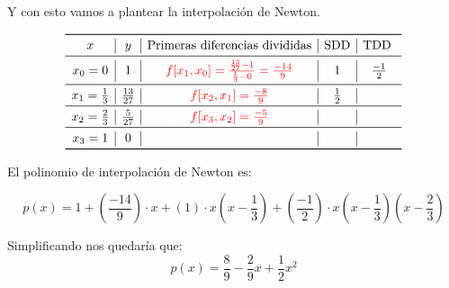 Y con esto vamos a plantear la interpolación de Newton.

\[
\begin{array}{c | c | c | c | c}
\toprule
x & y & \text{Primeras diferencias divididas} & \text{SDD} & \text{TDD } \\
\midrule
x_0 = 0 & 1 & \textcolor{red}{f[x_1, x_0] = \frac{\frac{13}{27} - 1}{\frac{1}{3} - 0} = \frac{-14}{9}} & 1 & \frac{-1}{2}\\
\midrule
x_{1} = \frac{1}{3} & \frac{13}{27} & \textcolor{red}{f[x_2, x_1] = \frac{-8}{9}} & \frac{1}{2} & \\
\midrule
x_{2} = \frac{2}{3} & \frac{5}{27} & \textcolor{red}{f[x_3, x_2] = \frac{-5}{9}} &  \\
\midrule
x_3 = 1 & 0 & & & \\
\bottomrule
\end{array}
\]

El polinomio de interpolación de Newton es:

\[
p(x) = 1 + \left(\frac{-14}{9}\right) \cdot x + \left(1\right) \cdot x(x - \frac{1}{3}) + \left(\frac{-1}{2}\right) \cdot x(x - \frac{1}{3})(x - \frac{2}{3})
\]


Simplificando nos quedaría que: 
\[
p(x) = \frac{8}{9} - \frac{2}{9}x + \frac{1}{2}x^2
\]
